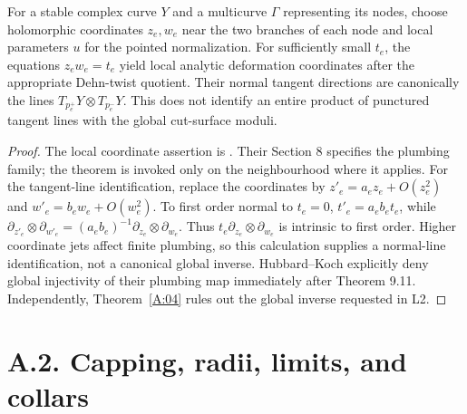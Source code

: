 \begin{proposition}\label{A:plumbing}
For a stable complex curve $Y$ and a multicurve $\Gamma$ representing
its nodes, choose holomorphic coordinates $z_e,w_e$ near the two
branches of each node and local parameters $u$ for the pointed
normalization. For sufficiently small $t_e$, the equations
$z_ew_e=t_e$ yield local analytic deformation coordinates after the
appropriate Dehn-twist quotient. Their normal tangent directions are
canonically the lines $T_{p_e^+}Y\otimes T_{p_e^-}Y$.
This does not identify an entire product of punctured tangent lines
with the global cut-surface moduli.
\end{proposition}
\begin{proof}
The local coordinate assertion is \citet[Theorem 9.11 and Theorem
10.1]{HubbardKoch2014}. Their Section 8 specifies the plumbing family;
the theorem is invoked only on the neighbourhood where it applies.
For the tangent-line identification, replace the coordinates by
$z'_e=a_ez_e+O(z_e^2)$ and $w'_e=b_ew_e+O(w_e^2)$.
To first order normal to $t_e=0$, $t'_e=a_eb_et_e$, while
$\partial_{z'_e}\otimes\partial_{w'_e}
=(a_eb_e)^{-1}\partial_{z_e}\otimes\partial_{w_e}$.
Thus $t_e\partial_{z_e}\otimes\partial_{w_e}$ is intrinsic to first
order. Higher coordinate jets affect finite plumbing, so this
calculation supplies a normal-line identification, not a canonical
global inverse. Hubbard--Koch explicitly deny global injectivity of
their plumbing map immediately after Theorem 9.11. Independently,
Theorem~\ref{A:04} rules out the global inverse requested in L2.
\end{proof}



\section{A.2. Capping, radii, limits, and collars}



